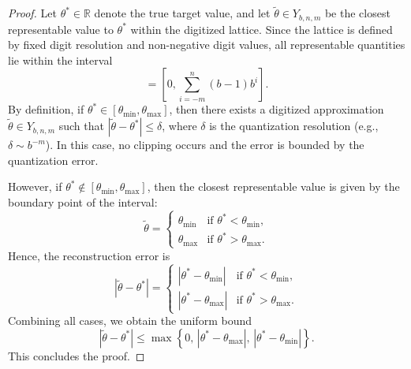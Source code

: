 \documentclass[10pt,a4paper]{amsart}
\begin{document}
\begin{proof}
Let \( \theta^* \in \mathbb{R} \) denote the true target value, and let \( \tilde{\theta} \in Y_{b,n,m} \) be the closest representable value to \( \theta^* \) within the digitized lattice. Since the lattice is defined by fixed digit resolution and non-negative digit values, all representable quantities lie within the interval
\begin{equation}
[\theta_{\min}, \theta_{\max}] = \left[ 0, \sum_{i=-m}^{n} (b-1) b^i \right].
\end{equation}
By definition, if \( \theta^* \in [\theta_{\min}, \theta_{\max}] \), then there exists a digitized approximation \( \tilde{\theta} \in Y_{b,n,m} \) such that \( |\tilde{\theta} - \theta^*| \leq \delta \), where \( \delta \) is the quantization resolution (e.g., \( \delta \sim b^{-m} \)). In this case, no clipping occurs and the error is bounded by the quantization error.

However, if \( \theta^* \notin [\theta_{\min}, \theta_{\max}] \), then the closest representable value is given by the boundary point of the interval:
\[
\tilde{\theta} = 
\begin{cases}
\theta_{\min} & \text{if } \theta^* < \theta_{\min}, \\
\theta_{\max} & \text{if } \theta^* > \theta_{\max}.
\end{cases}
\]
Hence, the reconstruction error is
\[
|\tilde{\theta} - \theta^*| = 
\begin{cases}
|\theta^* - \theta_{\min}| & \text{if } \theta^* < \theta_{\min}, \\
|\theta^* - \theta_{\max}| & \text{if } \theta^* > \theta_{\max}.
\end{cases}
\]
Combining all cases, we obtain the uniform bound
\begin{equation}
|\tilde{\theta} - \theta^*| \leq \max \left\{ 0,\, |\theta^* - \theta_{\max}|,\, |\theta^* - \theta_{\min}| \right\}.
\end{equation}
This concludes the proof.
\end{proof}
\end{document}
